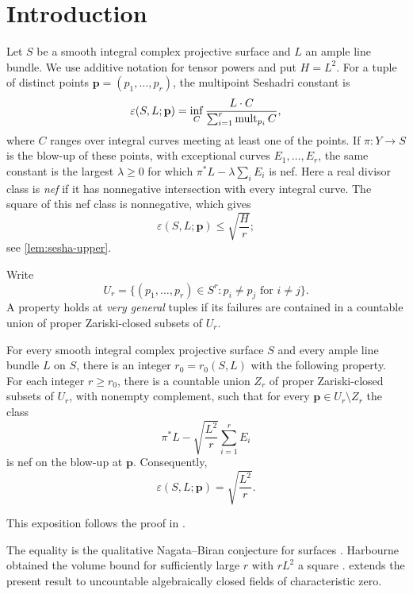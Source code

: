 \section{Introduction}\label{sec:introduction}

Let $S$ be a smooth integral complex projective surface and $L$ an ample line bundle. We use additive notation for tensor powers and put $H=L^2$. For a tuple of distinct points $\mathbf{p}=(p_1,\ldots,p_r)$, the multipoint Seshadri constant is
\[
 \varepsilon(S,L;\mathbf{p})
 =\inf_C\frac{L\cdot C}{\sum_{i=1}^r\operatorname{mult}_{p_i}C},
\]
where $C$ ranges over integral curves meeting at least one of the points. If $\pi:Y\to S$ is the blow-up of these points, with exceptional curves $E_1,\ldots,E_r$, the same constant is the largest $\lambda\ge0$ for which $\pi^*L-\lambda\sum_iE_i$ is nef. Here a real divisor class is \emph{nef} if it has nonnegative intersection with every integral curve. The square of this nef class is nonnegative, which gives
\begin{equation}\label{eq:upper-bound}
 \varepsilon(S,L;\mathbf{p})\le\sqrt{\frac Hr};
\end{equation}
see \cref{lem:sesha-upper}.

Write
\[
 U_r=\{(p_1,\ldots,p_r)\in S^r:p_i\ne p_j\text{ for }i\ne j\}.
\]
A property holds at \emph{very general} tuples if its failures are contained in a countable union of proper Zariski-closed subsets of $U_r$.

\begin{maintheorem}\label{thm:main}
For every smooth integral complex projective surface $S$ and every ample line bundle $L$ on $S$, there is an integer $r_0=r_0(S,L)$ with the following property. For each integer $r\ge r_0$, there is a countable union $Z_r$ of proper Zariski-closed subsets of $U_r$, with nonempty complement, such that for every $\mathbf{p}\in U_r\setminus Z_r$ the class
\[
 \pi^*L-\sqrt{\frac{L^2}{r}}\sum_{i=1}^r E_i
\]
is nef on the blow-up at $\mathbf{p}$. Consequently,
\[
 \varepsilon(S,L;\mathbf{p})=\sqrt{\frac{L^2}{r}}.
\]
\end{maintheorem}

This exposition follows the proof in \cite{OpenAIMathSource}.


The equality is the qualitative Nagata--Biran conjecture for surfaces \cite[Conjecture~4.3]{SyzdekSzemberg2010}. Harbourne obtained the volume bound for sufficiently large $r$ with $rL^2$ a square \cite[Proposition~I.2]{Harbourne2003}.  extends the present result to uncountable algebraically closed fields of characteristic zero.


